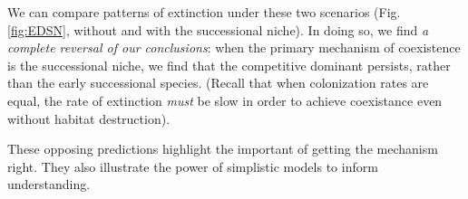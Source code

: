 We can compare patterns of extinction under these two scenarios (Fig. \ref{fig:EDSN}, without and with the successional niche). In doing so, we find \emph{a complete reversal of our conclusions}: when the primary mechanism of coexistence is the successional niche, we find that the competitive dominant persists, rather than the early successional species. (Recall that when colonization rates are equal, the rate of extinction \emph{must} be slow in order to achieve coexistance even without habitat destruction).

These opposing predictions highlight the important of getting the mechanism right. They also illustrate the power of simplistic models to inform understanding.

\medskip \noindent
\begin{boxedminipage}{\linewidth}
  {\footnotesize
}
\end{boxedminipage}
